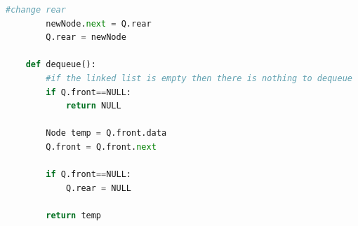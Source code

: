 \documentclass{article}
\begin{document}
\begin{enumerate}
\begin{enumerate}
\begin{latin}
\begin{flushright}
\begin{lstlisting}[language=Python]
		#change rear
		newNode.next = Q.rear
		Q.rear = newNode

	def dequeue():
		#if the linked list is empty then there is nothing to dequeue
		if Q.front==NULL:
			return NULL

		Node temp = Q.front.data
		Q.front = Q.front.next

		if Q.front==NULL:
			Q.rear = NULL

		return temp

			\end{lstlisting}
			\end{flushright}								
			\end{latin}

	\end{enumerate}
\end{enumerate}

\newpage
\end{document}
